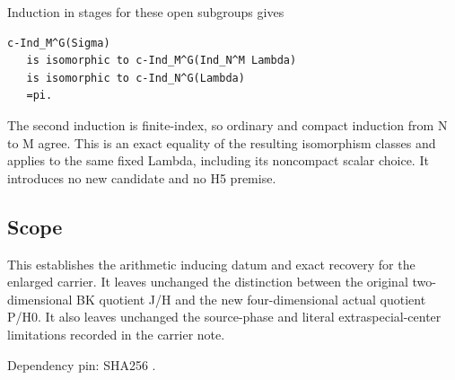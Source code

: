 Induction in stages for these open subgroups gives

\begin{Verbatim}[fontsize=\small,breaklines=true,breakanywhere=true]
c-Ind_M^G(Sigma)
   is isomorphic to c-Ind_M^G(Ind_N^M Lambda)
   is isomorphic to c-Ind_N^G(Lambda)
   =pi.
\end{Verbatim}

The second induction is finite-index, so ordinary and compact induction
from N to M agree. This is an exact equality of the resulting
isomorphism classes and applies to the same fixed Lambda, including its
noncompact scalar choice. It introduces no new candidate and no H5
premise.

\hypertarget{rank4_stages-scope}{%
\subsection{Scope}\label{rank4_stages-scope}}

This establishes the arithmetic inducing datum and exact recovery for
the enlarged carrier. It leaves unchanged the distinction between the
original two-dimensional BK quotient J/H and the new four-dimensional
actual quotient P/H0. It also leaves unchanged the source-phase and
literal extraspecial-center limitations recorded in the carrier note.

Dependency pin:  SHA256
.
